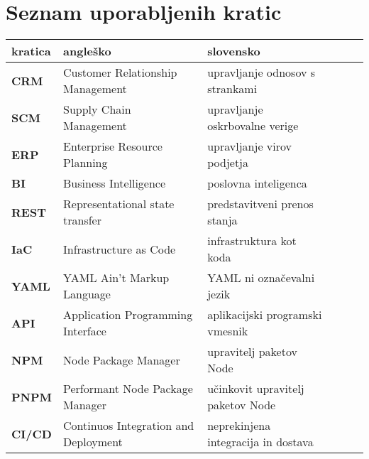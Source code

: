 \chapter*{Seznam uporabljenih kratic}

\begin{tabularx}{\textwidth}{lX|lX|lX}
  {\bf kratica} & {\bf angleško} & {\bf slovensko} \\ \hline
  {\bf CRM} & Customer Relationship Management & upravljanje odnosov s strankami \\
  {\bf SCM} & Supply Chain Management & upravljanje oskrbovalne verige \\
  {\bf ERP} & Enterprise Resource Planning & upravljanje virov podjetja \\
  {\bf BI} & Business Intelligence & poslovna inteligenca \\
  {\bf REST} & Representational state transfer & predstavitveni prenos stanja \\
  {\bf IaC} & Infrastructure as Code & infrastruktura kot koda \\
  {\bf YAML} & YAML Ain't Markup Language & YAML ni označevalni jezik \\
  {\bf API} & Application Programming Interface & aplikacijski programski vmesnik \\
  {\bf NPM} & Node Package Manager & upravitelj paketov Node \\
  {\bf PNPM} & Performant Node Package Manager & učinkovit upravitelj paketov Node \\
  {\bf CI/CD} & Continuos Integration and Deployment & neprekinjena integracija in dostava \\
  
\end{tabularx}